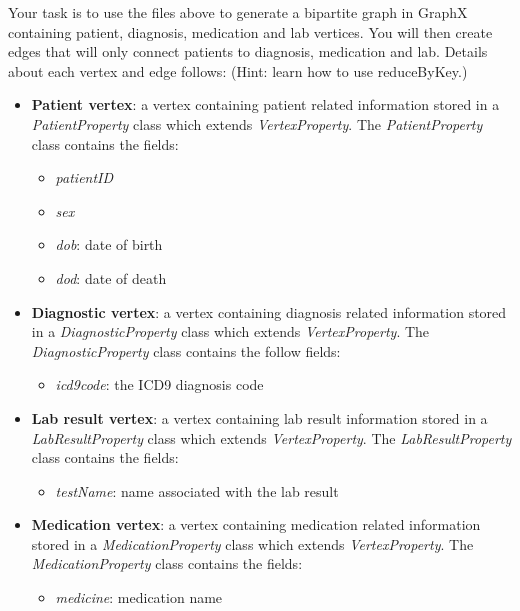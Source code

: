 \documentclass[12pt]{article}
\begin{document}
Your task is to use the files above to generate a bipartite graph in GraphX containing patient, diagnosis, medication and lab vertices. You will then create edges that will only connect patients to diagnosis, medication and lab. Details about each vertex and edge follows: (Hint: learn how to use reduceByKey.)

\begin{itemize}
\item \textbf{Patient vertex}: a vertex containing patient related information stored in a  \textit{PatientProperty} class which extends  \textit{VertexProperty}. The  \textit{PatientProperty} class contains the fields:
\begin{itemize}
\item \textit{patientID}
\item \textit{sex}
\item \textit{dob}: date of birth
\item \textit{dod}: date of death
\end{itemize}

\item\textbf{Diagnostic vertex}: a vertex containing diagnosis related information stored in a \textit{DiagnosticProperty} class which extends  \textit{VertexProperty}. The \textit{DiagnosticProperty} class contains the follow fields:
\begin{itemize}
\item \textit{icd9code}: the ICD9 diagnosis code
\end{itemize}

\item \textbf{Lab result vertex}: a vertex containing lab result information stored in a  \textit{LabResultProperty} class which extends \textit{VertexProperty}. The  \textit{LabResultProperty} class contains the fields:
\begin{itemize}
\item \textit{testName}: name associated with the lab result
\end{itemize}

\item \textbf{Medication vertex}: a vertex containing medication related information stored in a \textit{MedicationProperty} class which extends \textit{VertexProperty}. The \textit{MedicationProperty} class contains the fields:
\begin{itemize}
\item \textit{medicine}: medication name
\end{itemize}
\end{itemize}
\end{document}
